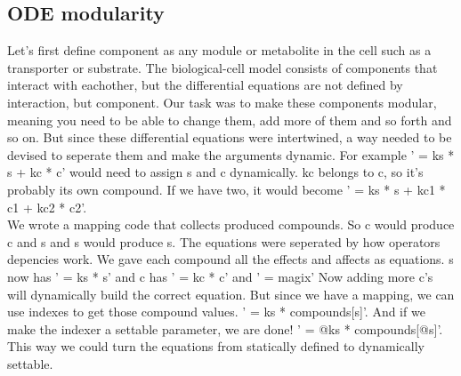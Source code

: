\documentclass[10pt,a4paper]{report}
\begin{document}
		\subsection{ODE modularity}
			Let's first define component as any module or metabolite in the cell such as a transporter or substrate. The biological-cell model consists of components that interact with eachother, but the differential equations are not defined by interaction, but component. Our task was to make these components modular, meaning you need to be able to change them, add more of them and so forth and so on. But since these differential equations were intertwined, a way needed to be devised to seperate them and make the arguments dynamic. For example ' = ks * s + kc * c' would need to assign s and c dynamically. kc belongs to c, so it's probably its own compound. If we have two, it would become ' = ks * s + kc1 * c1 + kc2 * c2'.\\
			We wrote a mapping code that collects produced compounds. So c would produce c and s and s would produce s. The equations were seperated by how operators depencies work. We gave each compound all the effects and affects as equations. s now has ' = ks * s' and c has ' = kc * c' and ' = magix' Now adding more c's will dynamically build the correct equation. But since we have a mapping, we can use indexes to get those compound values. ' = ks * compounds[s]'. And if we make the indexer a settable parameter, we are done! ' = @ks * compounds[@s]'. \\
			This way we could turn the equations from statically defined to dynamically settable.
			
\end{document}
